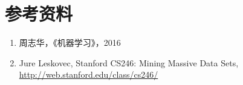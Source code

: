 
\section{参考资料}
\begin{enumerate}
	\item 周志华，《机器学习》，2016
	\item Jure Leskovec, Stanford CS246: Mining Massive Data Sets, \url{http://web.stanford.edu/class/cs246/}
\end{enumerate}